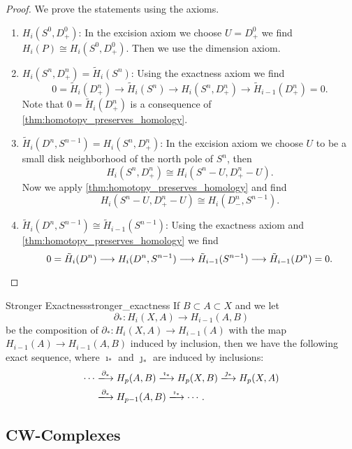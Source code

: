 \documentclass{article}
\begin{document}
\begin{proof}
    We prove the statements using the axioms.
    \begin{enumerate}
        \item $H_i(S^0,D^0_+)$:
        In the excision axiom we choose $U=D^0_+$ we find $H_i(P) \cong H_i(S^0,D^0_+)$.
        Then we use the dimension axiom.
        \item $H_i(S^n,D^n_+) = \tilde{H}_i(S^n)$:
        Using the exactness axiom we find
        \[ 0 = \tilde{H}_i(D^n_+) \longrightarrow \tilde{H}_i(S^n) \longrightarrow H_i(S^n,D^n_+) \longrightarrow \tilde{H}_{i-1}(D^n_+) = 0. \]
        Note that $0 = \tilde{H}_i(D^n_+)$ is a consequence of \cref{thm:homotopy_preserves_homology}.
        \item $\tilde{H}_i(D^n, S^{n-1}) = H_i(S^n,D^n_+)$:
        In the excision axiom we choose $U$ to be a small disk neighborhood of the north pole of $S^n$, then
        \[ H_i(S^n,D^n_+) \cong H_i(S^n - U, D^n_+ - U). \]
        Now we apply \cref{thm:homotopy_preserves_homology} and find
        \[ H_i(S^n - U, D^n_+ - U) \cong H_i(D^n_-,S^{n-1}). \]
        \item $\tilde{H}_i(D^n,S^{n-1}) \cong \tilde{H}_{i-1}(S^{n-1})$:
        Using the exactness axiom and \cref{thm:homotopy_preserves_homology} we find
        \[ 0 = \tilde{H}_i(D^n) \longrightarrow H_i(D^n,S^{n-1}) \longrightarrow \tilde{H}_{i-1}(S^{n-1}) \longrightarrow \tilde{H}_{i-1}(D^n) = 0. \qedhere \]
    \end{enumerate}
\end{proof}

\begin{theorem}{Stronger Exactness}{stronger_exactness}
    If $B\subset A \subset X$ and we let
    \[ \partial_*: H_i(X,A) \rightarrow H_{i-1}(A,B) \]
    be the composition of $\partial_*:H_i(X,A) \rightarrow H_{i-1}(A)$ with the map $H_{i-1}(A) \rightarrow H_{i-1}(A,B)$ induced by inclusion, then we have the following exact sequence, where $\imath_*$ and $\jmath_*$ are induced by inclusions:
    \begin{align*}
        \cdots &\xlongrightarrow{\partial_*} H_p(A,B) \xlongrightarrow{\imath_*} H_p(X,B) \xlongrightarrow{\jmath_*} H_p(X,A) \\
        &\xlongrightarrow{\partial_*} H_{p-1}(A,B) \xlongrightarrow{\imath_*}\cdots.
    \end{align*}
\end{theorem}

\subsection{CW-Complexes}
\end{document}
